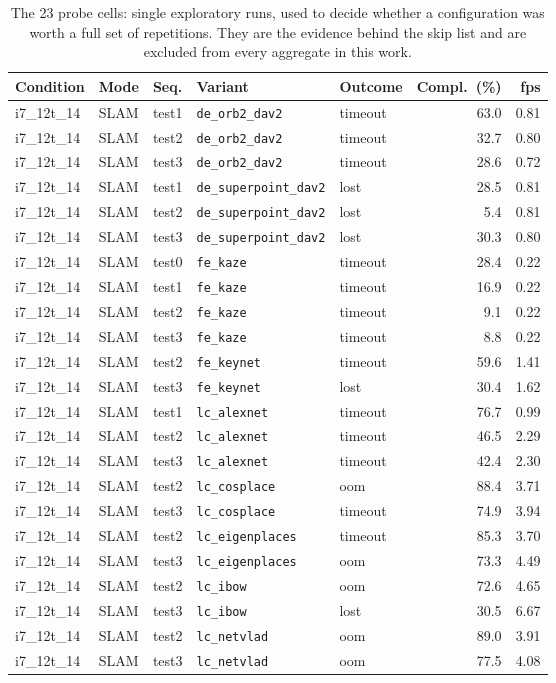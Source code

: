 \begin{table}[htbp]
\centering
\caption{The 23 probe cells: single exploratory runs, used to decide whether a configuration was worth a full set of repetitions. They are the evidence behind the skip list and are excluded from every aggregate in this work.}
\label{tab:probe-cells}
\begin{tabular}{lllllrr}
\toprule
Condition & Mode & Seq. & Variant & Outcome & Compl.\ (\%) & fps \\
\midrule
i7_12t_14 & SLAM & test1 & \texttt{de\_orb2\_dav2} & timeout & 63.0 & 0.81 \\
i7_12t_14 & SLAM & test2 & \texttt{de\_orb2\_dav2} & timeout & 32.7 & 0.80 \\
i7_12t_14 & SLAM & test3 & \texttt{de\_orb2\_dav2} & timeout & 28.6 & 0.72 \\
i7_12t_14 & SLAM & test1 & \texttt{de\_superpoint\_dav2} & lost & 28.5 & 0.81 \\
i7_12t_14 & SLAM & test2 & \texttt{de\_superpoint\_dav2} & lost & 5.4 & 0.81 \\
i7_12t_14 & SLAM & test3 & \texttt{de\_superpoint\_dav2} & lost & 30.3 & 0.80 \\
i7_12t_14 & SLAM & test0 & \texttt{fe\_kaze} & timeout & 28.4 & 0.22 \\
i7_12t_14 & SLAM & test1 & \texttt{fe\_kaze} & timeout & 16.9 & 0.22 \\
i7_12t_14 & SLAM & test2 & \texttt{fe\_kaze} & timeout & 9.1 & 0.22 \\
i7_12t_14 & SLAM & test3 & \texttt{fe\_kaze} & timeout & 8.8 & 0.22 \\
i7_12t_14 & SLAM & test2 & \texttt{fe\_keynet} & timeout & 59.6 & 1.41 \\
i7_12t_14 & SLAM & test3 & \texttt{fe\_keynet} & lost & 30.4 & 1.62 \\
i7_12t_14 & SLAM & test1 & \texttt{lc\_alexnet} & timeout & 76.7 & 0.99 \\
i7_12t_14 & SLAM & test2 & \texttt{lc\_alexnet} & timeout & 46.5 & 2.29 \\
i7_12t_14 & SLAM & test3 & \texttt{lc\_alexnet} & timeout & 42.4 & 2.30 \\
i7_12t_14 & SLAM & test2 & \texttt{lc\_cosplace} & oom & 88.4 & 3.71 \\
i7_12t_14 & SLAM & test3 & \texttt{lc\_cosplace} & timeout & 74.9 & 3.94 \\
i7_12t_14 & SLAM & test2 & \texttt{lc\_eigenplaces} & timeout & 85.3 & 3.70 \\
i7_12t_14 & SLAM & test3 & \texttt{lc\_eigenplaces} & oom & 73.3 & 4.49 \\
i7_12t_14 & SLAM & test2 & \texttt{lc\_ibow} & oom & 72.6 & 4.65 \\
i7_12t_14 & SLAM & test3 & \texttt{lc\_ibow} & lost & 30.5 & 6.67 \\
i7_12t_14 & SLAM & test2 & \texttt{lc\_netvlad} & oom & 89.0 & 3.91 \\
i7_12t_14 & SLAM & test3 & \texttt{lc\_netvlad} & oom & 77.5 & 4.08 \\
\bottomrule
\end{tabular}
\end{table}
